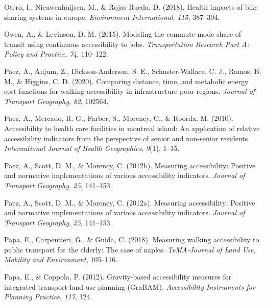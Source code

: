 \documentclass[
11pt, %
oneside, %
english, %
singlespacing, %
]{macthesis} %
\newlength{\cslhangindent}
\newenvironment{CSLReferences}[2] %
 {%
  \setlength{\parindent}{0pt}
  \ifodd #1 \everypar{\setlength{\hangindent}{\cslhangindent}}\ignorespaces\fi
  \ifnum #2 > 0
  \setlength{\parskip}{#2\baselineskip}
  \fi
 }%
 {}
\begin{document}
\begin{CSLReferences}{1}{0}
\leavevmode{}%
Otero, I., Nieuwenhuijsen, M., \& Rojas-Rueda, D. (2018). Health impacts of bike sharing systems in europe. \emph{Environment International}, \emph{115}, 387--394.

\leavevmode{}%
Owen, A., \& Levinson, D. M. (2015). Modeling the commute mode share of transit using continuous accessibility to jobs. \emph{Transportation Research Part A: Policy and Practice}, \emph{74}, 110--122.

\leavevmode{}%
Paez, A., Anjum, Z., Dickson-Anderson, S. E., Schuster-Wallace, C. J., Ramos, B. M., \& Higgins, C. D. (2020). Comparing distance, time, and metabolic energy cost functions for walking accessibility in infrastructure-poor regions. \emph{Journal of Transport Geography}, \emph{82}, 102564.

\leavevmode{}%
Paez, A., Mercado, R. G., Farber, S., Morency, C., \& Roorda, M. (2010). Accessibility to health care facilities in montreal island: An application of relative accessibility indicators from the perspective of senior and non-senior residents. \emph{International Journal of Health Geographics}, \emph{9}(1), 1--15.

\leavevmode{}%
Paez, A., Scott, D. M., \& Morency, C. (2012b). Measuring accessibility: Positive and normative implementations of various accessibility indicators. \emph{Journal of Transport Geography}, \emph{25}, 141--153.

\leavevmode{}%
Paez, A., Scott, D. M., \& Morency, C. (2012a). Measuring accessibility: Positive and normative implementations of various accessibility indicators. \emph{Journal of Transport Geography}, \emph{25}, 141--153.

\leavevmode{}%
Papa, E., Carpentieri, G., \& Guida, C. (2018). Measuring walking accessibility to public transport for the elderly: The case of naples. \emph{TeMA-Journal of Land Use, Mobility and Environment}, 105--116.

\leavevmode{}%
Papa, E., \& Coppola, P. (2012). Gravity-based accessibility measures for integrated transport-land use planning (GraBAM). \emph{Accessibility Instruments for Planning Practice}, \emph{117}, 124.


\end{CSLReferences}
\end{document}
